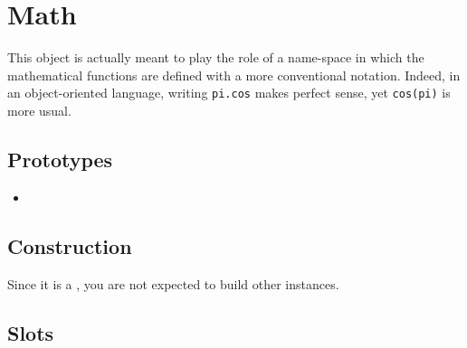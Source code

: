 \section{Math}

This object is actually meant to play the role of a name-space in
which the mathematical functions are defined with a more conventional
notation.  Indeed, in an object-oriented language, writing
\lstinline|pi.cos| makes perfect sense, yet \lstinline|cos(pi)| is
more usual.

\subsection{Prototypes}
\begin{itemize}
\item {}
\end{itemize}

\subsection{Construction}

Since it is a , you are not expected to build
other instances.

\subsection{Slots}

